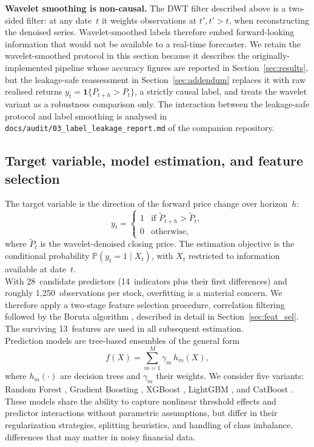 \documentclass{rQUF2e}
\begin{document}
\noindent \textbf{Wavelet smoothing is non-causal.} The DWT
filter described above is a two-sided filter: at any date~$t$
it weights observations at $t', t' > t$, when reconstructing the
denoised series. Wavelet-smoothed labels therefore embed
forward-looking information that would not be available to a
real-time forecaster. We retain the wavelet-smoothed protocol
in this section because it describes the originally-implemented
pipeline whose accuracy figures are reported in
Section~\ref{sec:results}, but the leakage-safe reassessment in
Section~\ref{sec:addendum} replaces it with raw realised returns
$y_t = \mathbf{1}\{P_{t+h} > P_t\}$, a strictly causal label,
and treats the wavelet variant as a robustness comparison only.
The interaction between the leakage-safe protocol and label
smoothing is analysed in
\texttt{docs/audit/03\_label\_leakage\_report.md} of the
companion repository.

\subsection{Target variable, model estimation, and feature selection}

The target variable is the direction of the forward price change over horizon~$h$:
\begin{equation}
y_t =
\begin{cases}
1 & \text{if } \tilde{P}_{t+h} > \tilde{P}_t, \\
0 & \text{otherwise,}
\end{cases}
\end{equation}
where $\tilde{P}_t$ is the wavelet-denoised closing price. The estimation objective is the conditional probability $\mathbb{P}(y_t = 1 \mid X_t)$, with $X_t$ restricted to information available at date~$t$. \\

\noindent With 28~candidate predictors (14~indicators plus their first differences) and roughly 1{,}250~observations per stock, overfitting is a material concern. We therefore apply a two-stage feature selection procedure, correlation filtering followed by the Boruta algorithm \citep{kursa2010feature}, described in detail in Section~\ref{sec:feat_sel}. The surviving 13~features are used in all subsequent estimation. \\

\noindent Prediction models are tree-based ensembles of the general form
\begin{equation}
f(X) = \sum_{m=1}^{M} \gamma_m \, h_m(X),
\end{equation}
where $h_m(\cdot)$ are decision trees and $\gamma_m$ their weights. We consider five variants: Random Forest \citep{breiman2001random}, Gradient Boosting \citep{friedman2001greedy}, XGBoost \citep{chen2016xgboost}, LightGBM \citep{ke2017lightgbm}, and CatBoost \citep{prokhorenkova2018catboost}. These models share the ability to capture nonlinear threshold effects and predictor interactions without parametric assumptions, but differ in their regularization strategies, splitting heuristics, and handling of class imbalance, differences that may matter in noisy financial data.
\end{document}
